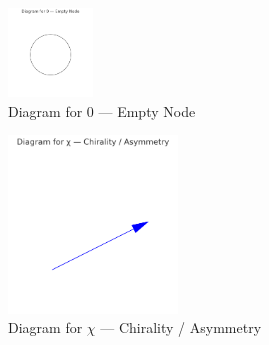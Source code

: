 \begin{figure}[h!]
  \centering
  \includegraphics[width=0.2\textwidth]{hs_diagram_0.png}
  \caption{Diagram for $0$ — Empty Node}
\end{figure}

\begin{figure}[h!]
  \centering
  \includegraphics[width=0.4\textwidth]{hs_diagram_chi.png}
  \caption{Diagram for $\chi$ — Chirality / Asymmetry}
\end{figure}
